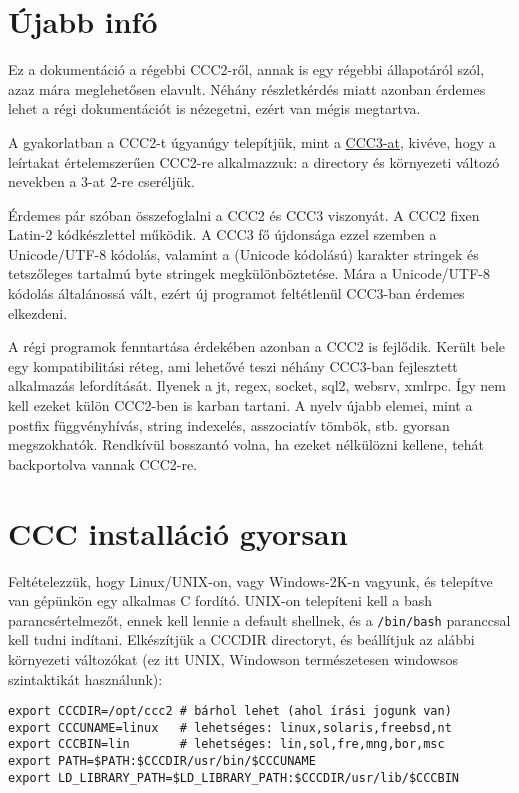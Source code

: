 



\section{Újabb infó}

Ez a dokumentáció a régebbi CCC2-ről, 
annak is egy régebbi állapotáról szól, azaz mára meglehetősen elavult.
Néhány részletkérdés miatt azonban érdemes lehet a régi dokumentációt 
is nézegetni, ezért van mégis megtartva.

A gyakorlatban a CCC2-t úgyanúgy telepítjük, mint a 
\href{http://ccc.comfirm.hu/ccc3/download/olvass.html}{CCC3-at},
kivéve, hogy a leírtakat értelemszerűen CCC2-re alkalmazzuk:
a directory és környezeti változó nevekben a 3-at 2-re cseréljük.

Érdemes pár szóban összefoglalni a CCC2 és CCC3 viszonyát.
A CCC2 fixen Latin-2 kódkészlettel működik. A CCC3 fő újdonsága
ezzel szemben a Unicode/UTF-8 kódolás, valamint a (Unicode kódolású) 
karakter stringek és tetszőleges tartalmú byte stringek megkülönböztetése.
Mára a Unicode/UTF-8 kódolás általánossá vált, ezért új programot
feltétlenül CCC3-ban érdemes elkezdeni. 

A régi programok fenntartása érdekében azonban a CCC2 is fejlődik.
Került bele egy kompatibilitási réteg, ami lehetővé teszi néhány
CCC3-ban fejlesztett alkalmazás lefordítását. Ilyenek a jt, regex, 
socket, sql2, websrv, xmlrpc. Így nem kell ezeket külön CCC2-ben is 
karban tartani. A nyelv újabb elemei, mint a postfix függvényhívás, 
string indexelés, asszociatív tömbök, stb.  gyorsan megszokhatók. 
Rendkívül bosszantó volna, ha ezeket  nélkülözni kellene, 
tehát backportolva vannak CCC2-re. 


\section{CCC installáció gyorsan}

Feltételezzük, hogy Linux/UNIX-on, vagy Windows-2K-n vagyunk,
és telepítve van gépünkön egy alkalmas C fordító. 
UNIX-on telepíteni kell a bash parancsértelmezőt,
ennek kell lennie a default shellnek, és a \verb!/bin/bash!
paranccsal kell tudni indítani.
Elkészítjük a CCCDIR directoryt, és beállítjuk az alábbi
környezeti változókat (ez itt UNIX, Windowson természetesen
windowsos szintaktikát használunk):
\begin{verbatim}
export CCCDIR=/opt/ccc2 # bárhol lehet (ahol írási jogunk van)
export CCCUNAME=linux   # lehetséges: linux,solaris,freebsd,nt
export CCCBIN=lin       # lehetséges: lin,sol,fre,mng,bor,msc
export PATH=$PATH:$CCCDIR/usr/bin/$CCCUNAME
export LD_LIBRARY_PATH=$LD_LIBRARY_PATH:$CCCDIR/usr/lib/$CCCBIN
\end{verbatim}

